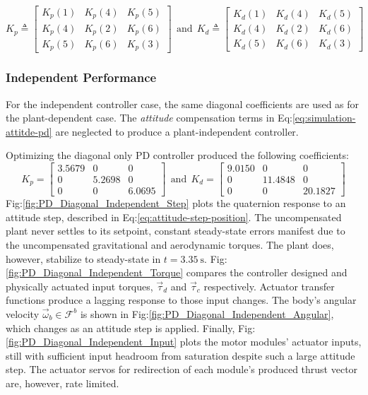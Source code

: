 \begin{equation}\label{eq:simulation-attitde-pd-symmetric-coefficients}
K_p\triangleq \begin{bmatrix}
K_p(1) & K_p(4) & K_p(5)\\
K_p(4) & K_p(2) & K_p(6)\\
K_p(5) & K_p(6) & K_p(3)
\end{bmatrix}
~~\text{and}~~K_d\triangleq \begin{bmatrix}
K_d(1) & K_d(4) & K_d(5)\\
K_d(4) & K_d(2) & K_d(6)\\
K_d(5) & K_d(6) & K_d(3)
\end{bmatrix}
\end{equation}
\subsubsection{Independent Performance}
\label{subsubsec:simulation.atttiude.pd.independent}
For the independent controller case, the same diagonal coefficients are used as for the plant-dependent case. The \emph{attitude} compensation terms in Eq:\ref{eq:simulation-attitde-pd} are neglected to produce a plant-independent controller. 
\par
Optimizing the diagonal only PD controller produced the following coefficients:
\begin{equation}\label{eq:optimized-pd-independent}
K_p = \begin{bmatrix}
3.5679 & 0 & 0\\
0 & 5.2698 & 0\\
0 & 0 & 6.0695
\end{bmatrix}
~~\text{and}~~K_d = \begin{bmatrix}
9.0150 & 0 & 0\\
0 & 11.4848 & 0\\
0 & 0 & 20.1827
\end{bmatrix}
\end{equation}
Fig:\ref{fig:PD_Diagonal_Independent_Step} plots the quaternion response to an attitude step, described in Eq:\ref{eq:attitude-step-position}. The uncompensated plant never settles to its setpoint, constant steady-state errors manifest due to the uncompensated gravitational and aerodynamic torques. The plant does, however, stabilize to steady-state in $t = 3.35~\text{s}$. Fig:\ref{fig:PD_Diagonal_Independent_Torque} compares the controller designed and physically actuated input torques, $\vec{\tau}_d$ and $\vec{\tau}_c$ respectively. Actuator transfer functions produce a lagging response to those input changes. The body's angular velocity $\vec{\omega}_b\in\mathcal{F}^{b}$ is shown in Fig:\ref{fig:PD_Diagonal_Independent_Angular}, which changes as an attitude step is applied. Finally, Fig:\ref{fig:PD_Diagonal_Independent_Input} plots the motor modules' actuator inputs, still with sufficient input headroom from saturation despite such a large attitude step. The actuator servos for redirection of each module's produced thrust vector are, however, rate limited.
